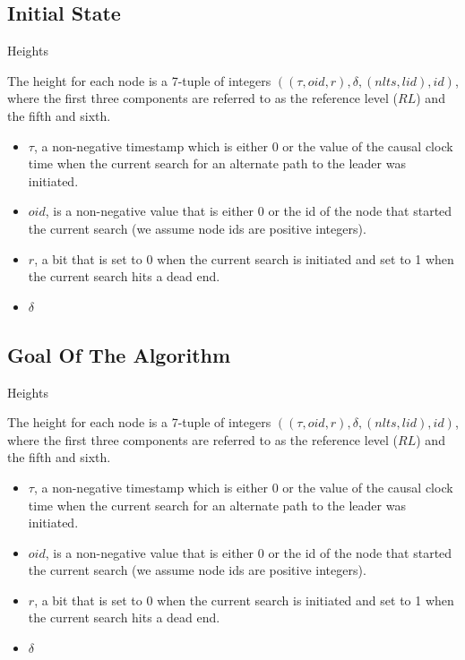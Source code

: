 \documentclass{beamer}
\begin{document}
\subsection{Initial State}
\begin{frame}{Heights}

The height for each node is a 7-tuple of integers $((\tau , oid, r), \delta, (nlts, lid), id)$, where the first three components are referred to as the reference level ($RL$) and the fifth and sixth.

\begin{itemize}
	\item $\tau$, a non-negative timestamp which is either 0 or the value of the causal clock time when the current search for an alternate path to the leader was initiated.
	\item $oid$, is a non-negative value that is either 0 or the id of the node that started the current search (we assume node ids are positive integers).
	\item $r$, a bit that is set to 0 when the current search is initiated and set to 1 when the current search hits a dead end.
	\item $\delta$


\end{itemize}

\end{frame}
\subsection{Goal Of The Algorithm}
\begin{frame}{Heights}

The height for each node is a 7-tuple of integers $((\tau , oid, r), \delta, (nlts, lid), id)$, where the first three components are referred to as the reference level ($RL$) and the fifth and sixth.

\begin{itemize}
	\item $\tau$, a non-negative timestamp which is either 0 or the value of the causal clock time when the current search for an alternate path to the leader was initiated.
	\item $oid$, is a non-negative value that is either 0 or the id of the node that started the current search (we assume node ids are positive integers).
	\item $r$, a bit that is set to 0 when the current search is initiated and set to 1 when the current search hits a dead end.
	\item $\delta$


\end{itemize}

\end{frame}
\end{document}

